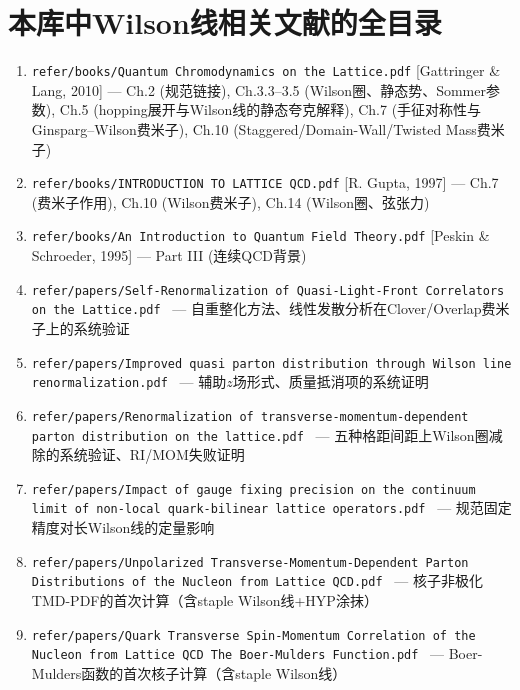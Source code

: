 \documentclass[12pt,a4paper]{ctexart}
\theoremstyle{definition}
\begin{document}
\section*{本库中Wilson线相关文献的全目录}

\small
\begin{enumerate}[leftmargin=*,nosep]
    \item \texttt{refer/books/Quantum Chromodynamics on the Lattice.pdf} [Gattringer \& Lang, 2010] — Ch.2 (规范链接), Ch.3.3--3.5 (Wilson圈、静态势、Sommer参数), Ch.5 (hopping展开与Wilson线的静态夸克解释), Ch.7 (手征对称性与Ginsparg--Wilson费米子), Ch.10 (Staggered/Domain-Wall/Twisted Mass费米子)
    \item \texttt{refer/books/INTRODUCTION TO LATTICE QCD.pdf} [R. Gupta, 1997] — Ch.7 (费米子作用), Ch.10 (Wilson费米子), Ch.14 (Wilson圈、弦张力)
    \item \texttt{refer/books/An Introduction to Quantum Field Theory.pdf} [Peskin \& Schroeder, 1995] — Part III (连续QCD背景)
    \item \texttt{refer/papers/Self-Renormalization of Quasi-Light-Front Correlators on the Lattice.pdf}~\cite{Huo2021self} — 自重整化方法、线性发散分析在Clover/Overlap费米子上的系统验证
    \item \texttt{refer/papers/Improved quasi parton distribution through Wilson line renormalization.pdf}~\cite{Chen2018WLrenorm} — 辅助$z$场形式、质量抵消项的系统证明
    \item \texttt{refer/papers/Renormalization of transverse-momentum-dependent parton distribution on the lattice.pdf}~\cite{Zhang2022renormTMD} — 五种格距间距上Wilson圈减除的系统验证、RI/MOM失败证明
    \item \texttt{refer/papers/Impact of gauge fixing precision on the continuum limit of non-local quark-bilinear lattice operators.pdf}~\cite{Zhang2024gauge_fixing} — 规范固定精度对长Wilson线的定量影响
    \item \texttt{refer/papers/Unpolarized Transverse-Momentum-Dependent Parton Distributions of the Nucleon from Lattice QCD.pdf}~\cite{He2024unpolTMD} — 核子非极化TMD-PDF的首次计算（含staple Wilson线+HYP涂抹）
    \item \texttt{refer/papers/Quark Transverse Spin-Momentum Correlation of the Nucleon from Lattice QCD The Boer-Mulders Function.pdf}~\cite{Ma2025BoerMulders} — Boer-Mulders函数的首次核子计算（含staple Wilson线）

\end{enumerate}
\end{document}
